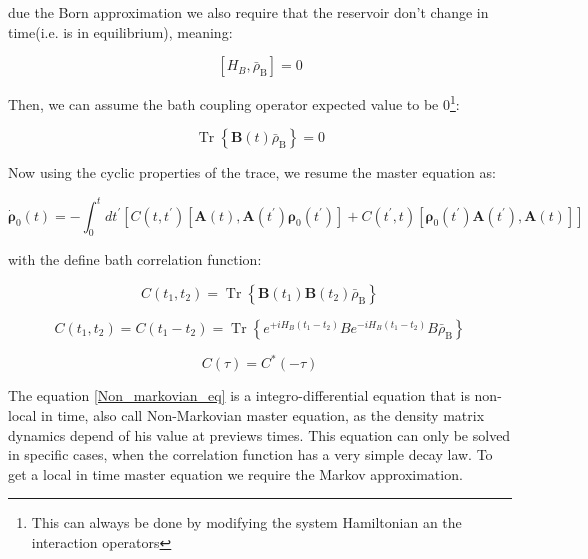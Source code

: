 \documentclass[%
preprint,
onecolumn,
notitlepag,
 amsmath,amssymb,
 aps,
 pra,
]{revtex4-2}
\begin{document}
due the Born approximation we also require that the reservoir don't change in time(i.e. is in equilibrium), meaning: 

\begin{equation}\left[H_{B}, \bar{\rho}_{\mathrm{B}}\right]=0\end{equation}

Then, we can assume the bath coupling operator expected value to be 0\footnote{This can always be done by modifying the system Hamiltonian an the interaction operators}:

\begin{equation}\operatorname{Tr}\left\{\boldsymbol{B}(t) \bar{\rho}_{\mathrm{B}}\right\}=0\end{equation}


Now using the cyclic properties of the trace, we resume the master equation as: 

\begin{equation}
\dot{\boldsymbol{\rho}}_0(t)=- \int_{0}^{t} d t^{\prime}\left[C\left(t, t^{\prime}\right)\left[\boldsymbol{A}(t), \boldsymbol{A}\left(t^{\prime}\right) \boldsymbol{\rho}_{\mathrm{0}}\left(t^{\prime}\right)\right]+C\left(t^{\prime}, t\right)\left[\boldsymbol{\rho}_{\mathrm{0}}\left(t^{\prime}\right) \boldsymbol{A}\left(t^{\prime}\right), \boldsymbol{A}(t)\right]\right]\end{equation}\label{Non_markovian_eq}

with the define bath correlation function: 

\begin{equation}C\left(t_{1}, t_{2}\right)=\operatorname{Tr}\left\{\boldsymbol{B}\left(t_{1}\right) \boldsymbol{B}\left(t_{2}\right) \bar{\rho}_{\mathrm{B}}\right\}\end{equation}




\begin{equation}C\left(t_{1}, t_{2}\right)=C\left(t_{1}-t_{2}\right)=\operatorname{Tr}\left\{e^{+i H_{B}\left(t_{1}-t_{2}\right)} B e^{-i H_{B}\left(t_{1}-t_{2}\right)} B \bar{\rho}_{\mathrm{B}}\right\}\end{equation}

\begin{equation}C(\tau)=C^{*}(-\tau)\end{equation}

The equation \ref{Non_markovian_eq} is a integro-differential equation that is non-local in time, also call Non-Markovian master equation, as the density matrix dynamics depend of  his value at previews times. This equation can only be solved in specific cases, when the correlation function has a very simple decay law. To get a local in time master equation we require  the Markov approximation.
\end{document}
